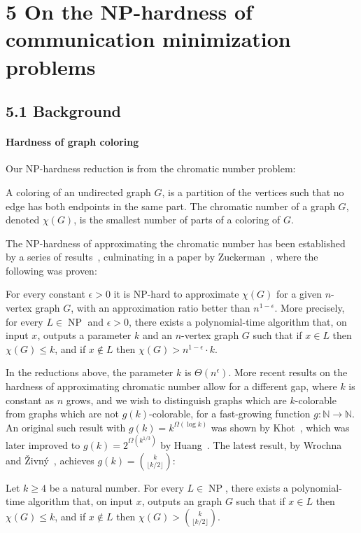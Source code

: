 \section*{5 On the NP-hardness of communication minimization problems}
\subsection*{5.1 Background}
\paragraph{Hardness of graph coloring}
Our NP-hardness reduction is from the chromatic number problem:
\setcounter{nttheorem}{18}
\begin{ntdefinition}
A coloring of an undirected graph $G$, is a partition of the vertices such that no edge has both endpoints in the same part. The chromatic number of a graph $G$, denoted $\chi(G)$, is the smallest number of parts of a coloring of $G$.
\end{ntdefinition}
The NP-hardness of approximating the chromatic number has been established by a series of results~\cite{ref57,ref31,ref24}, culminating in a paper by Zuckerman~\cite{ref82}, where the following was proven:
\begin{nttheorem}
For every constant $\epsilon>0$ it is NP-hard to approximate $\chi(G)$ for a given $n$-vertex graph $G$, with an approximation ratio better than $n^{1-\epsilon}$. More precisely, for every $L\in\operatorname{NP}$ and $\epsilon>0$, there exists a polynomial-time algorithm that, on input $x$, outputs a parameter $k$ and an $n$-vertex graph $G$ such that if $x\in L$ then $\chi(G)\leq k$, and if $x\notin L$ then $\chi(G)>n^{1-\epsilon}\cdot k$.
\end{nttheorem}
In the reductions above, the parameter $k$ is $\Theta(n^\epsilon)$. More recent results on the hardness of approximating chromatic number allow for a different gap, where $k$ is constant as $n$ grows, and we wish to distinguish graphs which are $k$-colorable from graphs which are not $g(k)$-colorable, for a fast-growing function $g:\mathbb N\to\mathbb N$. An original such result with $g(k)=k^{\Omega(\log k)}$ was shown by Khot~\cite{ref47}, which was later improved to $g(k)=2^{\Omega(k^{1/3})}$ by Huang~\cite{ref37}. The latest result, by Wrochna and \v Zivn\'y~\cite{ref79}, achieves $g(k)=\binom k{\lfloor k/2\rfloor}$:
\begin{nttheorem}
Let $k\geq4$ be a natural number. For every $L\in\operatorname{NP}$, there exists a polynomial-time algorithm that, on input $x$, outputs an graph $G$ such that if $x\in L$ then $\chi(G)\leq k$, and if $x\notin L$ then $\chi(G)>\binom k{\lfloor k/2\rfloor}$.
\end{nttheorem}
